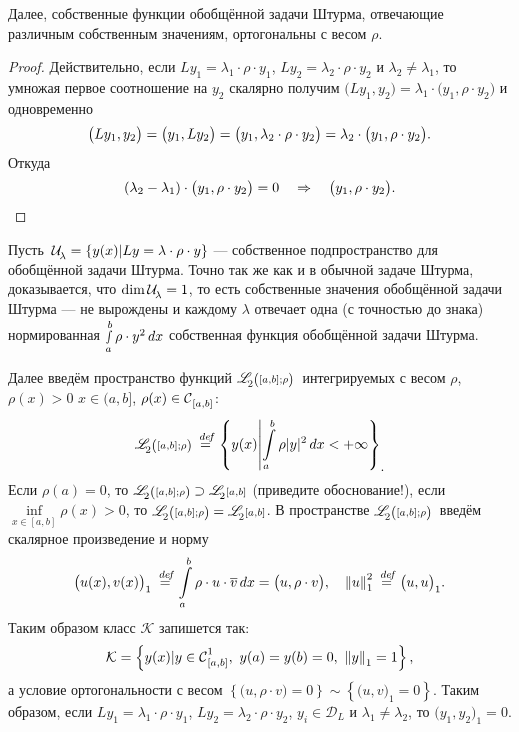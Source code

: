 \documentclass[12pt,a4paper,openany,fleqn]{book}
\newcommand {\defeq}{\stackrel{\hspace{0.09 cm}de\!f}{=}}
\newcommand {\eqdef}{\defeq}
\newcommand{\Cf}{\ensuremath{\mathcal{C}}}
\newcommand{\mc}[1]{\ensuremath{\mathcal{#1}}}
\newcommand{\Cfn}[2][]{\ensuremath{\Cf{\mathstrut}^{#2}_{#1}}}
\newcommand{\K}{\mc{K}}
\newcommand{\fL}[1][{[a,b]}]{\ensuremath{\mathscr{L}\hspace*{-0.11 cm}{\mathstrut}_{2}{\scriptstyle#1}}}
\newcommand{\norm}[1]{\ensuremath{\left\|#1\right\|}}
\newcommand{\Ul}[1][\lambda]{\ensuremath{\mc{U}\!{\mathstrut}_{#1}}}
\newcommand{\fLr}[1][{[a,b];\rho}]{\ensuremath{\mathscr{L}\hspace*{-0.11 cm}{\mathstrut}_{2}{\scriptstyle\left(\vphantom{A^b}#1\right)}}}
\theoremstyle{definition}
\begin{document}
	Далее, собственные функции обобщённой задачи Штурма, отвечающие различным собственным значениям, ортогональны с весом $\rho$. 
	\begin{proof}
		Действительно, если $Ly_1=\lambda_1\cdot\rho\cdot y_1$, $Ly_2=\lambda_2\cdot\rho\cdot y_2$ и $\lambda_2\neq\lambda_1$, то умножая первое соотношение на $y_2$ скалярно получим $\big(Ly_1,y_2\big)=\lambda_1\cdot\big(y_1,\rho\cdot y_2\big)$ и одновременно
		\begin{equation}
			\label{l8:eq:3}
			\hfill\big(Ly_1,y_2\big)=\big(y_1,Ly_2\big)=\big(y_1,\lambda_2\cdot\rho\cdot y_2\big)=\lambda_2\cdot\big(y_1,\rho\cdot y_2\big).\hfill
		\end{equation}	
		Откуда 
		\begin{equation}
			\hfill(\lambda_2-\lambda_1)\cdot\big(y_1,\rho\cdot y_2\big)=0\quad\Rightarrow\quad\big(y_1,\rho\cdot y_2\big).\hfill
		\end{equation}
	\end{proof}

	Пусть\  $\Ul=\left\{y(x)|Ly=\lambda\cdot\rho\cdot y\right\}$ --- собственное подпространство для обобщённой задачи Штурма. Точно так же как и в обычной задаче Штурма, доказывается, что $\dim\Ul=1$, то есть собственные значения обобщённой задачи Штурма --- не вырождены и каждому $\lambda$ отвечает одна (с точностью до знака) нормированная $\smallint\limits_a^b\rho\cdot y^2\,dx$ собственная функция обобщённой задачи Штурма.
	 
	Далее введём пространство функций \fLr\ интегрируемых с весом $\rho$, $\rho(x)>0$ $x\in(a,b]$, $\rho(x)\in\Cfn[{[a,b]}]{}$:
	\begin{equation*}
		\hfill\fLr\eqdef\left\{y(x)\middle| \int\limits_a^b\rho|y|^2\,dx<+\infty\right\}_{\displaystyle.}\hfill
	\end{equation*}
	Если $\rho(a)=0$, то $\fLr\supset\fL$ (приведите обоснование!), если $\displaystyle\inf\limits_{x\in[a,b]}\rho(x)>0$, то $\fLr=\fL$. В пространстве \fLr\ введём скалярное произведение и норму
	\begin{equation*}
		\hfill\big(u(x),v(x)\big)_1\eqdef\int\limits_a^b\rho\cdot u\cdot\overline{v}\,dx=\big(u,\rho\cdot v\big),\quad{\norm{u}}_1^2\eqdef\big(u,u\big)_1.\hfill
	\end{equation*}
	Таким образом класс $\K$ запишется так:
	\begin{equation*}
		\hfill\K=\left\{y(x)|y\in\Cfn[{[a,b]}]{1},\ y(a)=y(b)=0,\ \norm{y}_1=1\right\},\hfill
	\end{equation*}
	а условие ортогональности с весом $\left\{\big(u,\rho\cdot v\big)=0\right\}\sim\left\{\big(u,v\big)_1=0\right\}$. Таким образом, если $Ly_1=\lambda_1\cdot\rho\cdot y_1$, $Ly_2=\lambda_2\cdot\rho\cdot y_2$, $y_i\in\mc{D}_L$ и $\lambda_1\neq\lambda_2$, то $\big(y_1,y_2\big)_1=0$.
	
\end{document}
